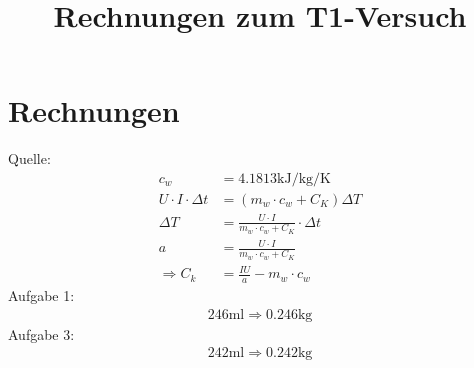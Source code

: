 \documentclass{scrarticle}
\title{Rechnungen zum T1-Versuch}
\begin{document}
\maketitle
	\tableofcontents
	
    
\section{Rechnungen}
Quelle: \cite[\ac{vgl.}][15]{Muller.g}
\begin{align}
    c_w &= 4.1813 \unit{\kilo\joule\per\kilogram\per\kelvin}\\
    U \cdot I \cdot \Delta t &= (m_w \cdot c_w+ C_K) \Delta T\\
    \Delta T &= \frac{U \cdot I }{m_w \cdot c_w+ C_K}\cdot \Delta t\\
    a &= \frac{U \cdot I }{m_w \cdot c_w+ C_K}\\
    \Rightarrow C_k &= \frac{IU}{a}-m_w \cdot c_w
\end{align}
\noindent Aufgabe 1:
\begin{align}
    246 \unit{\milli\litre} \Rightarrow 0.246\unit{\kilogram}
\end{align}
\noindent Aufgabe 3:
\begin{align}
    242\unit{\milli\litre} \Rightarrow 0.242\unit{\kilogram}
\end{align}
\printbibliography
\end{document}

